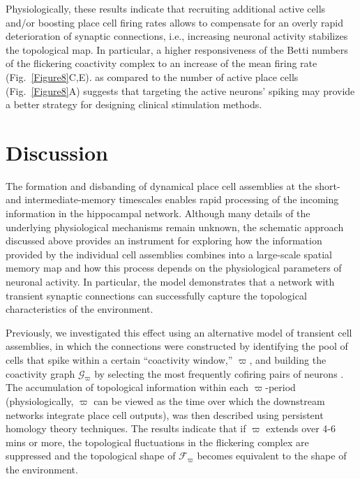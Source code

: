 \documentclass[12pt,tightenlines]{revtex4}
\begin{document}
Physiologically, these results indicate that recruiting additional active cells and/or boosting place cell firing rates 
allows to compensate for an overly rapid deterioration of synaptic connections, i.e., increasing neuronal activity 
stabilizes the topological map. In particular, a higher responsiveness of the Betti numbers of the flickering coactivity 
complex to an increase of the mean firing rate (Fig.~\ref{Figure8}C,E). 
as compared to the number of active place cells (Fig.~\ref{Figure8}A) suggests that targeting the active neurons' 
spiking may provide a better strategy for designing clinical stimulation methods.

\section{Discussion}
\label{section:discuss}

The formation and disbanding of dynamical place cell assemblies at the short- and intermediate-memory timescales 
enables rapid processing of the incoming information in the hippocampal network. Although many details of the 
underlying physiological mechanisms remain unknown, the schematic approach discussed above provides an 
instrument for exploring how the information provided by the individual cell assemblies combines into a large-scale 
spatial memory map and how this process depends on the physiological parameters of neuronal activity. In particular, 
the model demonstrates that a network with transient synaptic connections can successfully capture the topological 
characteristics of the environment.

Previously, we investigated this effect using an alternative model of transient cell assemblies, in which the connections
were constructed by identifying the pool of cells that spike within a certain ``coactivity window,'' $\varpi$, and building 
the coactivity graph $\mathcal{G}_{\varpi}$ by selecting the most frequently cofiring pairs of neurons \cite{MB}. The 
accumulation of topological information within each $\varpi$-period (physiologically, $\varpi$ can be viewed as the time 
over which the downstream networks integrate place cell outputs), was then described using persistent homology theory 
techniques. The results indicate that if $\varpi$ extends over 4-6 mins or more, the topological fluctuations in the 
flickering complex are suppressed and the topological shape of $\mathcal{F}_{\varpi}$ becomes equivalent to the shape 
of the environment. 
\end{document}
